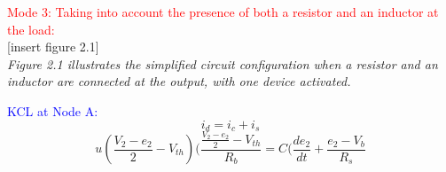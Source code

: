 %
%
%
%
%
%
%
%


\large\textcolor{red}{Mode 3: Taking into account the presence of both a resistor and an inductor at the load:}\\

[insert figure 2.1]\\

\emph{Figure 2.1 illustrates the simplified circuit configuration when a resistor and an inductor are connected at the output, with one device activated.}

\textcolor{blue}{KCL at Node A:}\\
\begin{equation}
    i_d=i_c+i_s
\end{equation}
\begin{equation}
    u(\frac{V_2-e_2}{2}-V_{th})(\frac{\frac{V_2-e_2}{2}-V_{th}}{R_b}=C(\frac{de_2}{dt}+\frac{e_2-V_b}{R_s}
\end{equation}\\

